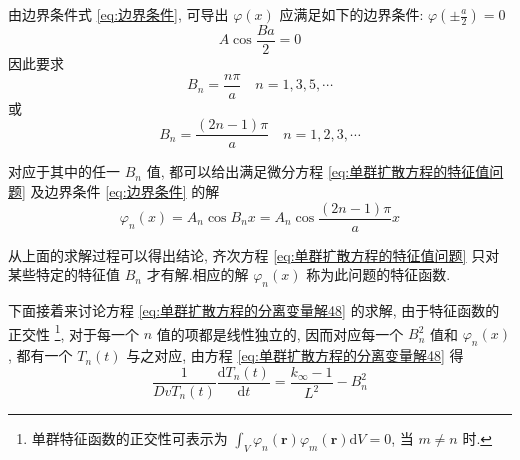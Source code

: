 \documentclass{Sichuan Normal University}
\begin{document}
由边界条件式 \eqref{eq:边界条件}, 可导出 $\varphi(x)$ 应满足如下的边界条件: $\varphi\left( \pm \frac{a}{2}\right)=0$
\begin{equation}
A \cos \frac{B a}{2}=0
\end{equation}
因此要求
\begin{equation}
B_n=\frac{n \pi}{a} \quad n=1,3,5, \cdots
\end{equation}
或
\begin{equation}
B_n=\frac{(2 n-1) \pi}{a} \quad n=1,2,3, \cdots
\label{eq:单群扩散方程的特征值问题410}
\end{equation}

对应于其中的任一 $B_n$ 值, 都可以给出满足微分方程 \eqref{eq:单群扩散方程的特征值问题} 及边界条件 \eqref{eq:边界条件} 的解
\begin{equation}
\varphi_n(x)=A_n \cos B_n x=A_n \cos \frac{(2 n-1) \pi}{a} x
\end{equation}

从上面的求解过程可以得出结论, 齐次方程 \eqref{eq:单群扩散方程的特征值问题} 只对某些特定的特征值 $B_n$ 才有解.相应的解 $\varphi_n(x)$ 称为此问题的特征函数.

下面接着来讨论方程 \eqref{eq:单群扩散方程的分离变量解48} 的求解, 由于特征函数的正交性 \footnote{单群特征函数的正交性可表示为 $\int_V \varphi_n(\boldsymbol{r}) \varphi_m(\boldsymbol{r}) \mathrm{d} V=0$, 当 $m \neq n$ 时.
}, 对于每一个 $n$ 值的项都是线性独立的, 因而对应每一个 $B_n^2$ 值和 $\varphi_n(x)$, 都有一个 $T_n(t)$ 与之对应, 由方程 \eqref{eq:单群扩散方程的分离变量解48} 得
\begin{equation}
\frac{1}{{Dv}T_n(t)} \frac{\mathrm{d} T_n(t)}{\mathrm{d} t}=\frac{k_{\infty}-1}{L^2}-B_n^2
\end{equation}
\end{document}

